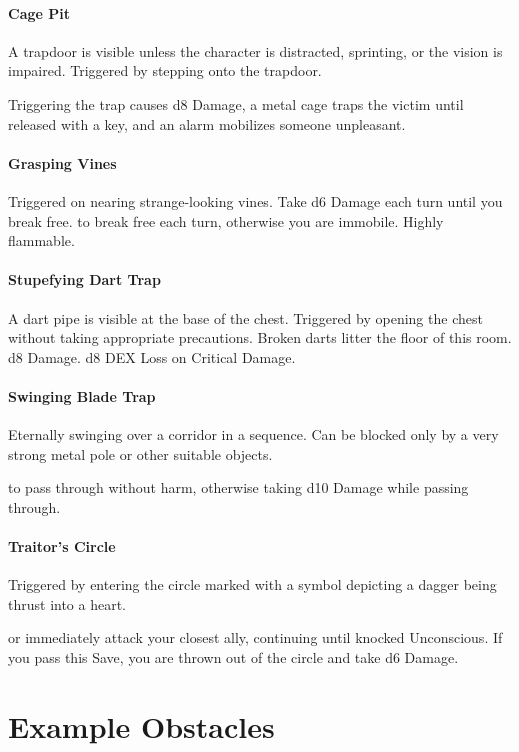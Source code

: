 \documentclass[itdr]{subfiles}
\begin{document}
\paragraph{Cage Pit}
A trapdoor is visible unless the character is distracted, sprinting, or the vision is impaired. Triggered by stepping onto the trapdoor.

Triggering the trap causes d8 Damage, a metal cage traps the victim until released with a key, and an alarm mobilizes someone unpleasant.

\vfill
\paragraph{Grasping Vines}
Triggered on nearing strange-looking vines. Take d6 Damage each turn until you break free.  to break free each turn, otherwise you are immobile. Highly flammable.

\vfill
\paragraph{Stupefying Dart Trap}
A dart pipe is visible at the base of the chest. Triggered by opening the chest without taking appropriate precautions. Broken darts litter the floor of this room.
d8 Damage. d8 DEX Loss on Critical Damage.

\vfill
\paragraph{Swinging Blade Trap}
Eternally swinging over a corridor in a sequence. Can be blocked only by a very strong metal pole or other suitable objects.

 to pass through without harm, otherwise taking d10 Damage while passing through.

\vfill
\paragraph{Traitor's Circle}
Triggered by entering the circle marked with a symbol depicting a dagger being thrust into a heart.

 or immediately attack your closest ally, continuing until knocked Unconscious. If you pass this Save, you are thrown out of the circle and take d6 Damage.

\vfill
\break

\section{Example Obstacles}
\end{document}
